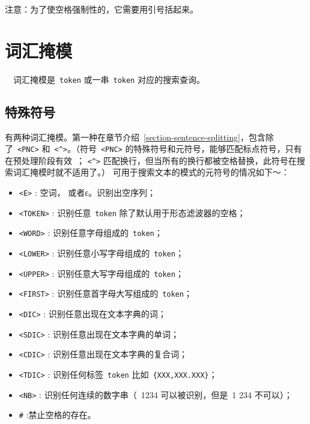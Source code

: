 \bigskip
\noindent 注意：为了使空格强制性的，它需要用引号括起来。




\section{词汇掩模}
 \ \ 词汇掩模是\ \verb+token+ 或一串\ \verb+token+ 对应的搜索查询。

\subsection{特殊符号}
\label{section-special-symbols}

有两种词汇掩模。第一种在章节介绍~\ref{section-sentence-splitting}，包含除了\ \verb$<PNC>$  和\ \verb+<^>+。（符号\ \verb$<PNC>$ 的特殊符号和元符号，能够匹配标点符号，只有在预处理阶段有效~； \verb+<^>+ 匹配换行，但当所有的换行都被空格替换，此符号在搜索词汇掩模时就不适用了。） 可用于搜索文本的模式的元符号的情况如下～：

\index{\verb+#+}
\begin{itemize}
  \item \verb+<E>+ : 空词， 或者ε。识别出空序列；
  \item \verb+<TOKEN>+ : 识别任意\ \verb+token+ 除了默认用于形态滤波器的空格；
  \item \verb+<WORD>+ : 识别任意字母组成的\ \verb+token+；
  \item \verb+<LOWER>+ : 识别任意小写字母组成的\ \verb+token+；
  \item \verb+<UPPER>+ : 识别任意大写字母组成的\ \verb+token+；
  \item \verb+<FIRST>+ : 识别任意首字母大写组成的\ \verb+token+；
  \item \verb+<DIC>+ : 识别任意出现在文本字典的词；
  \item \verb+<SDIC>+ : 识别任意出现在文本字典的单词；  
  \item \verb+<CDIC>+ : 识别任意出现在文本字典的复合词；
  \item \verb+<TDIC>+ : 识别任何标签\ \verb+token+ 比如\ \verb+{XXX,XXX.XXX}+；
  \item \verb+<NB>+ : 识别任何连续的数字串（\ 1234 可以被识别，但是\ 1 234 不可以）；
  \item \verb+#+ :禁止空格的存在。
\end{itemize}

